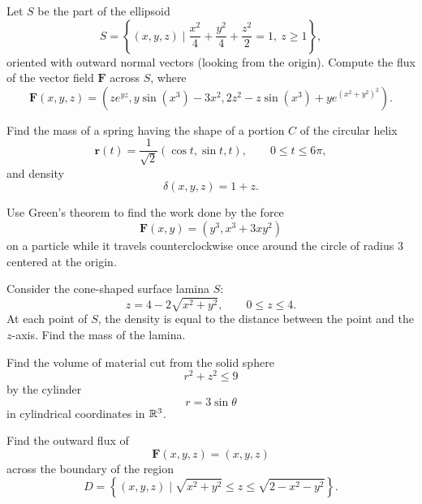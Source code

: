 \begin{problem}
Let $S$ be the part of the ellipsoid
\[
S=
\left\{(x, y, z)\mid 
\frac{x^2}{4}+\frac{y^2}{4}+\frac{z^2}{2}=1,
\ z\ge1
\right\},
\]
oriented with outward normal vectors (looking from the origin). Compute the flux of the vector field $\mathbf F$ across $S$, where
\[
\mathbf F(x, y, z)
=
\left(
ze^{yz},
 y\sin(x^3)-3x^2,
 2z^2-z\sin(x^3)+ye^{(x^2+y^2)^2}
\right).
\]
\end{problem}

\begin{problem}
Find the mass of a spring having the shape of a portion $C$ of the circular helix
\[
\mathbf r(t)=\frac{1}{\sqrt2}(\cos t, \sin t, t),
\qquad
0\le t\le6\pi,
\]
and density
\[
\delta(x, y, z)=1+z.
\]
\end{problem}

\begin{problem}
Use Green's theorem to find the work done by the force
\[
\mathbf F(x, y)=(y^3, x^3+3xy^2)
\]
on a particle while it travels counterclockwise once around the circle of radius $3$ centered at the origin.
\end{problem}

\begin{problem}
Consider the cone-shaped surface lamina $S$:
\[
z=4-2\sqrt{x^2+y^2},
\qquad
0\le z\le4.
\]
At each point of $S$, the density is equal to the distance between the point and the $z$-axis. Find the mass of the lamina.
\end{problem}

\begin{problem}
Find the volume of material cut from the solid sphere
\[
r^2+z^2\le9
\]
by the cylinder
\[
r=3\sin\theta
\]
in cylindrical coordinates in $\mathbb{R}^3$.
\end{problem}

\begin{problem}
Find the outward flux of
\[
\mathbf F(x, y, z)=(x, y, z)
\]
across the boundary of the region
\[
D=
\left\{(x, y, z)\mid 
\sqrt{x^2+y^2}\le z\le\sqrt{2-x^2-y^2}
\right\}.
\]
\end{problem}


